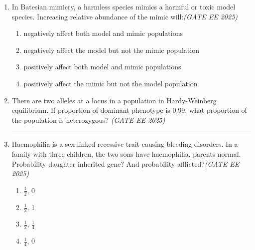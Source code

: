\documentclass[11pt,a4paper]{article}
\begin{document}
\begin{enumerate}[leftmargin=*,label=\textbf{Q.\arabic*},resume]
\item In Batesian mimicry, a harmless species mimics a harmful or toxic model species. Increasing relative abundance of the mimic will:\hfill \textit{(GATE EE 2025)}
\begin{multicols}{2}
\begin{enumerate}[label=(\Alph*)]
\item negatively affect both model and mimic populations
\item negatively affect the model but not the mimic population
\item positively affect both model and mimic populations
\item positively affect the mimic but not the model population
\end{enumerate}
\end{multicols}

\item There are two alleles at a locus in a population in Hardy-Weinberg equilibrium. If proportion of dominant phenotype is 0.99, what proportion of the population is heterozygous?
\hfill \textit{(GATE EE 2025)}
\rule{4cm}{0.15mm}

\item Haemophilia is a sex-linked recessive trait causing bleeding disorders. In a family with three children, the two sons have haemophilia, parents normal. Probability daughter inherited gene? And probability afflicted?\hfill \textit{(GATE EE 2025)}
\begin{multicols}{2}
\begin{enumerate}[label=(\Alph*)]
\item $\frac{1}{2}$, 0
\item $\frac{1}{2}$, 1
\item $\frac{1}{2}$, $\frac{1}{4}$
\item $\frac{1}{4}$, 0
\end{enumerate}
\end{multicols}

\end{enumerate}
\end{document}

